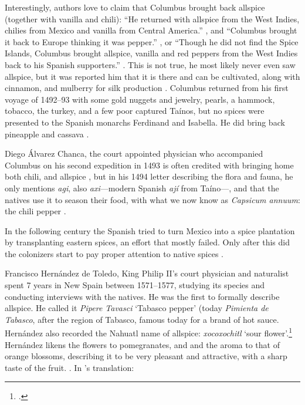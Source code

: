 Interestingly, authors love to claim that Columbus brought back allspice (together with vanilla and chili): ``He returned with allspice from the West Indies, chilies from Mexico and vanilla from Central America.'' \autocite[17]{craze_spice_1997}, and ``Columbus brought it back to Europe thinking it was pepper.'' \autocite[146]{czarra_spices_2009}, or ``Though he did not find the Spice Islands, Columbus brought allspice, vanilla and red peppers from the West Indies back to his Spanish supporters.'' \autocite[1]{parthasarathy_chemistry_2008}. This is not true, he most likely never even saw allspice, but it was reported him that it is there and can be cultivated, along with cinnamon, and mulberry for silk production \autocites[151]{colon_life_1959}. Columbus returned from his first voyage of 1492--93 with some gold nuggets and jewelry, pearls, a hammock, tobacco, the turkey, and a few poor captured Taínos, but no spices were presented to the Spanish monarchs Ferdinand and Isabella. He did bring back pineapple and cassava \autocite[11]{turner_spice_2004}. 

Diego Álvarez Chanca, the court appointed physician who accompanied Columbus on his second expedition in 1493 is often credited with bringing home both chili, and allspice \autocites[]{mccormick_history_nodate}, but in his 1494 letter describing the flora and fauna, he only mentions \textit{agi}, also \textit{axi}---modern Spanish \textit{ají} from Taíno---\autocite[see][34]{corominas_breve_1987}, and that the natives use it to season their food, with what we now know as \textit{Capsicum annuum}: the chili pepper \autocite[311]{chanca_american_2003}.

In the following century the Spanish tried to turn Mexico into a spice plantation by transplanting eastern spices, an effort that mostly failed. Only after this did the colonizers start to pay proper attention to native spices \autocite[6]{machuca_past_2020}. 

Francisco Hernández de Toledo, King Philip II's court physician and naturalist spent 7 years in New Spain between 1571--1577, studying its species and conducting interviews with the natives. He was the first to formally describe allspice. He called it \textit{Pipere Tavasci} `Tabasco pepper' (today \textit{Pimienta de Tabasco}, after the region of Tabasco, famous today for a brand of hot sauce. Hernández also recorded the Nahuatl name of allspice: \textit{xocoxochitl} `sour flower'.\footcite[cf.][xococ; xochitl]{ond} Hernández likens the flowers to pomegranates, and and the aroma to that of orange blossoms, describing it to be very pleasant and attractive, with a sharp taste of the fruit. \autocite[2]{hernandez_cuatro_1615}. In \textcite{machuca_past_2020}'s translation:

